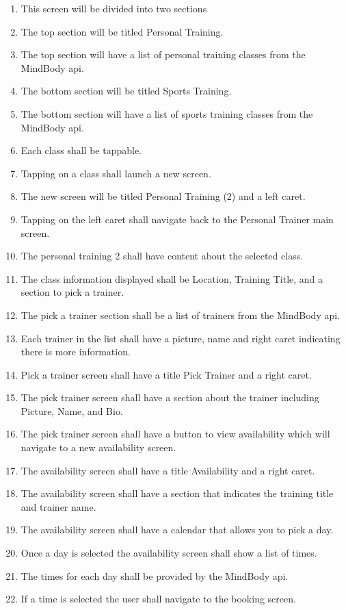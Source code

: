 \documentclass[letterpaper,10pt,titlepage]{article}
\begin{document}
\begin{enumerate}
\item This screen will be divided into two sections
\item The top section will be titled Personal Training.
\item The top section will have a list of personal training classes from the MindBody api.
\item The bottom section will be titled Sports Training.
\item The bottom section will have a list of sports training classes from the MindBody api.
\item Each class shall be tappable.
\item Tapping on a class shall launch a new screen.
\item The new screen will be titled Personal Training (2) and a left caret.
\item Tapping on the left caret shall navigate back to the Personal Trainer main screen.
\item The personal training 2 shall have content about the selected class.
\item The class information displayed shall be Location, Training Title, and a section to pick a trainer.
\item The pick a trainer section shall be a list of trainers from the MindBody api.
\item Each trainer in the list shall have a picture, name and right caret indicating there is more information.
\item Pick a trainer screen shall have a title Pick Trainer and a right caret.
\item The pick trainer screen shall have a section about the trainer including Picture, Name, and Bio.
\item The pick trainer screen shall have a button to view availability which will navigate to a new availability screen.
\item The availability screen shall have a title Availability and a right caret.
\item The availability screen shall have a section that indicates the training title and trainer name.
\item The availability screen shall have a calendar that allows you to pick a day.
\item Once a day is selected the availability screen shall show a list of times.
\item The times for each day shall be provided by the MindBody api.
\item If a time is selected the user shall navigate to the booking screen.

\end{enumerate}
\end{document}
